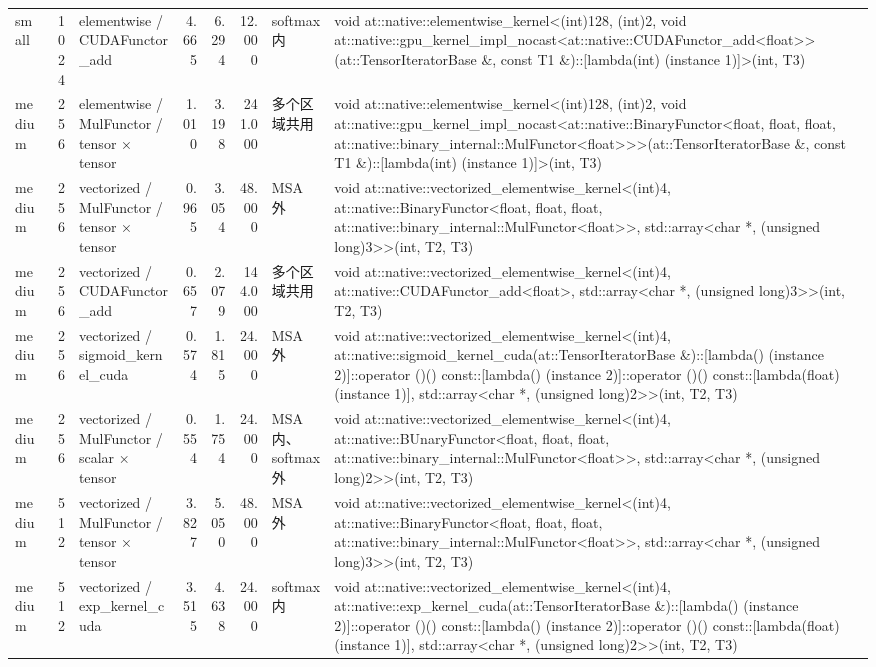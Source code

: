 \begin{tabular}{lrlrrrll}
small & 1024 & elementwise / CUDAFunctor\_add & 4.665 & 6.294 & 12.000 & softmax 内 & void at::native::elementwise\_kernel<(int)128, (int)2, void at::native::gpu\_kernel\_impl\_nocast<at::native::CUDAFunctor\_add<float>>(at::TensorIteratorBase \&, const T1 \&)::[lambda(int) (instance 1)]>(int, T3) \\
medium & 256 & elementwise / MulFunctor / tensor × tensor & 1.010 & 3.198 & 241.000 & 多个区域共用 & void at::native::elementwise\_kernel<(int)128, (int)2, void at::native::gpu\_kernel\_impl\_nocast<at::native::BinaryFunctor<float, float, float, at::native::binary\_internal::MulFunctor<float>>>(at::TensorIteratorBase \&, const T1 \&)::[lambda(int) (instance 1)]>(int, T3) \\
medium & 256 & vectorized / MulFunctor / tensor × tensor & 0.965 & 3.054 & 48.000 & MSA 外 & void at::native::vectorized\_elementwise\_kernel<(int)4, at::native::BinaryFunctor<float, float, float, at::native::binary\_internal::MulFunctor<float>>, std::array<char *, (unsigned long)3>>(int, T2, T3) \\
medium & 256 & vectorized / CUDAFunctor\_add & 0.657 & 2.079 & 144.000 & 多个区域共用 & void at::native::vectorized\_elementwise\_kernel<(int)4, at::native::CUDAFunctor\_add<float>, std::array<char *, (unsigned long)3>>(int, T2, T3) \\
medium & 256 & vectorized / sigmoid\_kernel\_cuda & 0.574 & 1.815 & 24.000 & MSA 外 & void at::native::vectorized\_elementwise\_kernel<(int)4, at::native::sigmoid\_kernel\_cuda(at::TensorIteratorBase \&)::[lambda() (instance 2)]::operator ()() const::[lambda() (instance 2)]::operator ()() const::[lambda(float) (instance 1)], std::array<char *, (unsigned long)2>>(int, T2, T3) \\
medium & 256 & vectorized / MulFunctor / scalar × tensor & 0.554 & 1.754 & 24.000 & MSA 内、softmax 外 & void at::native::vectorized\_elementwise\_kernel<(int)4, at::native::BUnaryFunctor<float, float, float, at::native::binary\_internal::MulFunctor<float>>, std::array<char *, (unsigned long)2>>(int, T2, T3) \\
medium & 512 & vectorized / MulFunctor / tensor × tensor & 3.827 & 5.050 & 48.000 & MSA 外 & void at::native::vectorized\_elementwise\_kernel<(int)4, at::native::BinaryFunctor<float, float, float, at::native::binary\_internal::MulFunctor<float>>, std::array<char *, (unsigned long)3>>(int, T2, T3) \\
medium & 512 & vectorized / exp\_kernel\_cuda & 3.515 & 4.638 & 24.000 & softmax 内 & void at::native::vectorized\_elementwise\_kernel<(int)4, at::native::exp\_kernel\_cuda(at::TensorIteratorBase \&)::[lambda() (instance 2)]::operator ()() const::[lambda() (instance 2)]::operator ()() const::[lambda(float) (instance 1)], std::array<char *, (unsigned long)2>>(int, T2, T3) \\

\end{tabular}
